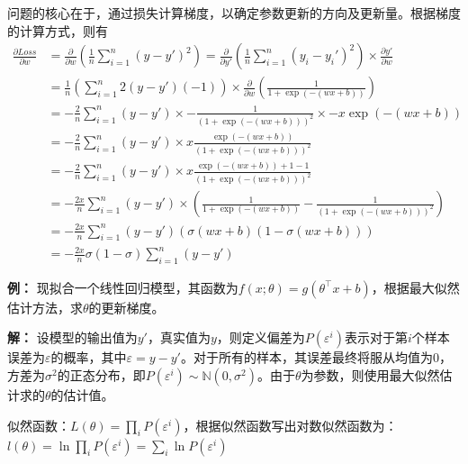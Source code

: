 \documentclass[12pt,a4paper]{article}
\begin{document}
  问题的核心在于，通过损失计算梯度，以确定参数更新的方向及更新量。根据梯度的计算方式，则有
  $$
  \begin{aligned}
    \frac{\partial Loss}{\partial w} &=  \frac{\partial}{\partial w} \left(\frac{1}{n} \sum _{i=1}^n (y-y')^2 \right) = \frac{\partial}{\partial y'} \left(\frac{1}{n} \sum _{i=1}^n (y_i-y_i')^2 \right) \times \frac{\partial y'}{\partial w} \\ 
    &= \frac{1}{n} \left(\sum_{i=1}^n 2(y-y')(-1) \right) \times \frac{\partial}{\partial w} \left( \frac{1}{1 + \exp(-(wx+b))} \right) \\ 
    &= -\frac{2}{n}\sum_{i=1}^n (y-y') \times -\frac{1}{(1+\exp(-(wx+b)))^2} \times -x\exp(-(w x+b)) \\ 
    &= -\frac{2}{n} \sum_{i=1}^n (y-y') \times x\frac{\exp(-(wx+b))}{(1+\exp(-(wx+b)))^2} \\ 
    &= -\frac{2}{n} \sum_{i=1}^n (y-y') \times x \frac{\exp(-(wx+b)) + 1 - 1}{(1+\exp(-(wx+b)))^2} \\ 
    &= -\frac{2x}{n} \sum_{i=1}^n (y-y') \times \left(\frac{1}{1+\exp(-(wx+b))} - \frac{1}{\left(1+\exp(-(wx+b))\right)^2} \right) \\ 
    &= -\frac{2x}{n}\sum_{i=1}^n (y-y') \left(\sigma(w x+b)(1-\sigma(w x+b))\right) \\ 
    &= -\frac{2x}{n}\sigma(1-\sigma) \sum_{i=1}^n (y-y')
  \end{aligned}
  $$

  \textbf{例：} 现拟合一个线性回归模型，其函数为$f(x;\theta)=g(\theta^\top x + b)$，根据最大似然估计方法，求$\theta$的更新梯度。

  \textbf{解：} 设模型的输出值为$y'$，真实值为$y$，则定义偏差为$P(\varepsilon^i)$表示对于第$i$个样本误差为$\varepsilon$的概率，其中$\varepsilon = y-y'$。对于所有的样本，其误差最终将服从均值为0，方差为$\sigma^2$的正态分布，即$P(\varepsilon^i)\sim \mathbb{N}(0, \sigma^2)$。由于$\theta$为参数，则使用最大似然估计求的$\theta$的估计值。

  似然函数：$L(\theta)=\prod\limits_i P(\varepsilon^i)$，根据似然函数写出对数似然函数为：$l(\theta)=\ln \prod\limits_i P(\varepsilon^i)=\sum\limits_i \ln P(\varepsilon^i)$
\end{document}
